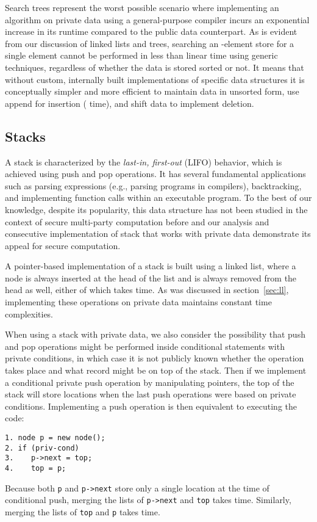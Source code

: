 \documentclass[11pt]{article}
\begin{document}
Search trees represent the worst possible scenario where implementing an
algorithm on private data using a general-purpose compiler incurs an
exponential increase in its runtime compared to the public data counterpart.
As is evident from our discussion of linked lists and trees, searching an
-element store for a single element cannot be performed in less than
linear time using generic techniques, regardless of whether the data is
stored sorted or not. It means that without custom, internally built
implementations of specific data structures it is conceptually simpler and
more efficient to maintain data in unsorted form, use append for insertion
( time), and shift data to implement deletion.

\subsection{Stacks}

A stack is characterized by the \textit{last-in, first-out} (LIFO) behavior,
which is achieved using push and pop operations. It has several fundamental
applications such as parsing expressions (e.g., parsing programs in
compilers), backtracking, and implementing function calls within an
executable program. To the best of our knowledge, despite its popularity,
this data structure has not been studied in the context of secure
multi-party computation before and our analysis and consecutive
implementation of stack that works with private data demonstrate its appeal
for secure computation.

A pointer-based implementation of a stack is built using a linked list,
where a node is always inserted at the head of the list and is always
removed from the head as well, either of which takes  time. As was
discussed in section~\ref{sec:ll}, implementing these operations on private
data maintains constant time complexities.

When using a stack with private data, we also consider the possibility that
push and pop operations might be performed inside conditional statements
with private conditions, in which case it is not publicly known whether the
operation takes place and what record might be on top of the stack. Then if
we implement a conditional private push operation by manipulating pointers,
the top of the stack will store  locations when the last  push
operations were based on private conditions. Implementing a push operation
is then equivalent to executing the code:

{\small \begin{verbatim}
1. node p = new node();
2. if (priv-cond)
3.    p->next = top;
4.    top = p;
\end{verbatim}} 
\noindent Because both \texttt{p} and \texttt{p->next} store
only a single location at the time of conditional push, merging the lists of
\texttt{p->next} and \texttt{top} takes  time. Similarly, merging the
lists of \texttt{top} and \texttt{p} takes  time.
\end{document}
